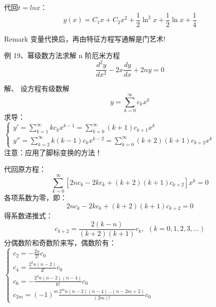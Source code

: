 \begin{frame}
	代回$t=ln x $：
	\begin{equation*}
		y(x)=C_1 x +C_2 x^2+\frac{1}{2} \ln ^2 x+\frac{1}{2}\ln x+\frac{1}{4}
	\end{equation*} 
	\begin{block} {Remark}
		变量代换后，再由特征方程写通解是门艺术!
	\end{block}  
\end{frame}

\begin{frame}
	\begin{exampleblock} {例 19、幂级数方法求解 n 阶厄米方程}
	\begin{equation*}
		\frac{d^2 y}{d x^2} -2x \frac{d y}{d x} +2n y =0 
	\end{equation*}     
	\end{exampleblock}	
	\alert{解、} 	设方程有级数解
	\begin{equation*}
		y=\sum_{k=0}^{\infty} c_k x^k
	\end{equation*}     
	求导：\\
	$\begin{cases}
		y' = \sum\limits_{k=1}^{\infty} k c_k x^{k-1} =\sum\limits_{k=0}^{\infty} (k+1) c_{k+1} x^{k}\\
		y'' = \sum\limits_{k=2}^{\infty} k (k-1) c_k x^{k-2} =  \sum\limits_{k=0}^{\infty} (k+2) (k+1) c_{k+2} x^k
	\end{cases}$ \\
	注意：应用了脚标变换的方法！
 \end{frame}

\begin{frame}
	代回原方程：
	\begin{equation*}
		\sum_{k=0}^{\infty} [ 2nc_k -2kc_k +(k+2)(k+1) c_{k+2}  ] x^k  =0
	\end{equation*}  
	各项系数为零，即： 
	\begin{equation*}
		2nc_k -2kc_k +(k+2)(k+1) c_{k+2} =0
	\end{equation*}   
	得系数递推式：
	\begin{equation*}
		c_{k+2} = \frac{ 2(k-n)}{(k+2)(k+1) } c_k, ~~  \left( k=0,1,2,3, ...  \right)
	\end{equation*}   
	分偶数阶和奇数阶来写，偶数阶有： \\
	$\displaystyle \begin{cases}
		c_2 =- \frac{2n}{2!} c_0\\
		c_4 = \frac{2^2n(n-2)}{4!} c_0 \\
		c_6 = -\frac{2^3n(n-2)(n-4)}{6!} c_0 \\
		c_{2m} = (-1) ^m \frac{2^mn(n-2)(n-4) ... (n-2m+2)  } {(2m)!} c_0
	\end{cases}$ \\
\end{frame}

